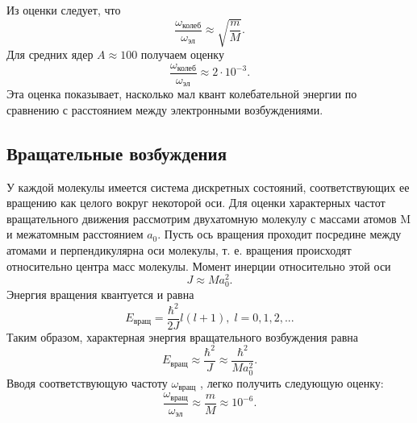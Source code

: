 \documentclass[a4paper,12pt]{article}
\begin{document}
Из оценки следует, что
\begin{equation}\label{eq: Oscillation energy contribution}
    \frac{\omega_\text{колеб}}{\omega_\text{эл}} \approx \sqrt{\frac{m}{M}}.
\end{equation}
Для средних ядер $A \approx 100$ получаем оценку
\begin{equation}\label{eq: Oscillation energy contribution estimate}
    \frac{\omega_\text{колеб}}{\omega_\text{эл}} \approx 2 \cdot 10^{-3}.
\end{equation}
Эта оценка показывает, насколько мал квант колебательной энергии по сравнению с расстоянием между электронными возбуждениями.

\subsection{Вращательные возбуждения}
У каждой молекулы имеется система дискретных состояний, соответствующих ее вращению как целого вокруг некоторой оси. Для оценки характерных частот вращательного движения рассмотрим двухатомную молекулу с массами атомов M и межатомным расстоянием $a_0$. Пусть ось вращения проходит посредине между атомами и перпендикулярна оси молекулы, т. е. вращения происходят относительно центра масс молекулы. Момент инерции относительно этой оси
\begin{equation}\label{eq: Momentum of inertia}
    J \approx Ma_0^2.
\end{equation}
Энергия вращения квантуется и равна
\begin{equation}\label{eq: Rotation energy}
    E_\text{вращ} = \frac{\hbar^2}{2J}l(l + 1),\; l = 0, 1, 2, . . .
\end{equation}
Таким образом, характерная энергия вращательного возбуждения равна
\begin{equation}\label{eq: Rotation energy approximated}
    E_\text{вращ} \approx \frac{\hbar^2}{J} \approx \frac{\hbar^2}{Ma_0^2} .
\end{equation}
Вводя соответствующую частоту $\omega_\text{вращ}$ , легко получить следующую оценку:
\begin{equation}\label{eq: Rotation energy contribution estimate}
    \frac{\omega_\text{вращ}}{\omega_\text{эл}} \approx \frac{m}{M} \approx 10^{-6}.
\end{equation}
\end{document}
